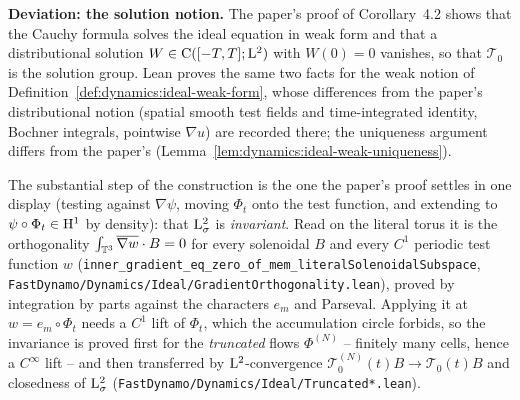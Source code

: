 \textbf{Deviation: the solution notion.}  The paper's proof of Corollary~4.2 shows that the
Cauchy formula solves the ideal equation in weak form and that a distributional solution
$W\in\mathrm{C}([-T,T];\mathrm{L}^2)$ with $W(0)=0$ vanishes, so that $\mathcal T_0$ is the solution group.
Lean proves the same two facts for the weak notion of
Definition~\ref{def:dynamics:ideal-weak-form}, whose differences from the paper's
distributional notion (spatial smooth test fields and time-integrated identity, Bochner
integrals, pointwise $\nabla u$) are recorded there; the uniqueness argument differs from the
paper's (Lemma~\ref{lem:dynamics:ideal-weak-uniqueness}).

The substantial step of the construction is the one the paper's proof settles in one display
(testing against $\nabla\psi$, moving $\Phi_t$ onto the test function, and extending to
$\psi\circ\Phi_t\in\mathrm{H}^1$ by density): that $\mathrm{L}^2_\sigma$ is \emph{invariant}.  Read on the
literal torus it is the orthogonality
$\int_{\mathbb{T}^3}\overline{\nabla w}\cdot B=0$ for every solenoidal $B$ and every $C^1$ periodic
test function $w$ (\texttt{inner\_gradient\_eq\_zero\_of\_mem\_literalSolenoidalSubspace},
\texttt{FastDynamo/Dynamics/Ideal/GradientOrthogonality.lean}), proved by integration by parts
against the characters $e_m$ and Parseval.  Applying it at $w=e_m\circ\Phi_t$ needs a $C^1$
lift of $\Phi_t$, which the accumulation circle forbids, so the invariance is proved first for
the \emph{truncated} flows $\Phi^{(N)}$ -- finitely many cells, hence a $C^\infty$ lift --
and then transferred by $\mathrm{L}^2$-convergence
$\mathcal T_0^{(N)}(t)B\to\mathcal T_0(t)B$ and closedness of $\mathrm{L}^2_\sigma$
(\texttt{FastDynamo/Dynamics/Ideal/Truncated*.lean}).

